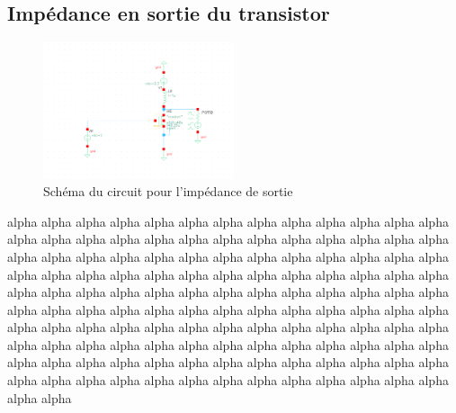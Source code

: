 \documentclass[a4paper]{article}
\begin{document}
\clearpage
\subsection{Imp\'edance en sortie du transistor}

\begin{figure}
\centering
\includegraphics[width=0.5\textwidth]{arch-transistor-output-impedance.png}
\caption{Sch\'ema du circuit pour l'imp\'edance de sortie}
\end{figure}

alpha alpha alpha alpha alpha alpha alpha alpha alpha alpha alpha alpha
alpha alpha alpha alpha alpha alpha alpha alpha alpha alpha alpha alpha
alpha alpha alpha alpha alpha alpha alpha alpha alpha alpha alpha alpha
alpha alpha alpha alpha alpha alpha alpha alpha alpha alpha alpha alpha
alpha alpha alpha alpha alpha alpha alpha alpha alpha alpha alpha alpha
alpha alpha alpha alpha alpha alpha alpha alpha alpha alpha alpha alpha
alpha alpha alpha alpha alpha alpha alpha alpha alpha alpha alpha alpha
alpha alpha alpha alpha alpha alpha alpha alpha alpha alpha alpha alpha
alpha alpha alpha alpha alpha alpha alpha alpha alpha alpha alpha alpha
alpha alpha alpha alpha alpha alpha alpha alpha alpha alpha alpha alpha
alpha alpha alpha alpha alpha alpha alpha alpha alpha alpha alpha alpha

\vskip 2cm

\end{document}
